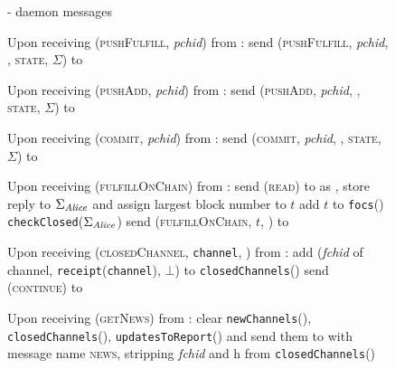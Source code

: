   \begin{figure}[H]
    \begin{systembox}{\fpaynet{} - daemon messages}
      \begin{algorithmic}[1]
        \State Upon receiving (\textsc{pushFulfill}, \textit{pchid}) from
        \alice:
        \Indent
          \State send (\textsc{pushFulfill}, \textit{pchid}, \alice,
          \textsc{state}, $\Sigma$) to \simulator
          \label{alg:fpaynet:daemon:fulfill}
        \EndIndent
        \Statex

        \State Upon receiving (\textsc{pushAdd}, \textit{pchid}) from \alice:
        \Indent
          \State send (\textsc{pushAdd}, \textit{pchid}, \alice, \textsc{state},
          $\Sigma$) to \simulator
          \label{alg:fpaynet:daemon:add}
        \EndIndent
        \Statex

        \State Upon receiving (\textsc{commit}, \textit{pchid}) from \alice:
        \Indent
          \State send (\textsc{commit}, \textit{pchid}, \alice, \textsc{state},
          $\Sigma$) to \simulator
          \label{alg:fpaynet:daemon:commit}
        \EndIndent
        \Statex

        \State Upon receiving (\textsc{fulfillOnChain}) from \alice:
        \Indent
          \State send (\textsc{read}) to \ledger{} as \alice{}, store reply to
          $\Sigma_{\mathit{Alice}}$ and assign largest block number to $t$
          \State add $t$ to \texttt{focs}(\alice)
          \State \texttt{checkClosed}($\Sigma_{\mathit{Alice}}$)
          \label{alg:fpaynet:daemon:foc:read}
          \State send (\textsc{fulfillOnChain}, $t$, \alice) to \simulator
        \EndIndent
        \Statex

        \State Upon receiving (\textsc{closedChannel}, \texttt{channel}, \alice)
        from \simulator:
        \Indent
          \State add (\textit{fchid} of channel,
          \texttt{receipt}(\texttt{channel}), $\bot$) to
          \texttt{closedChannels}(\alice)
          \label{alg:fpaynet:closedChannel:report}
          \State send (\textsc{continue}) to \simulator
        \EndIndent
        \Statex

        \State Upon receiving (\textsc{getNews}) from \alice:
        \label{alg:fpaynet:getnews}
        \Indent
          \State clear \texttt{newChannels}(\alice),
          \texttt{closedChannels}(\alice), \texttt{updatesToReport}(\alice) and
          send them to \alice{} with message name \textsc{news}, stripping
          \textit{fchid} and h from \texttt{closedChannels}(\alice)
          \label{alg:fpaynet:getnews:send}
        \EndIndent
      \end{algorithmic}
    \end{systembox}
    \caption{}
    \label{alg:fpaynet:daemon}
  \end{figure}
